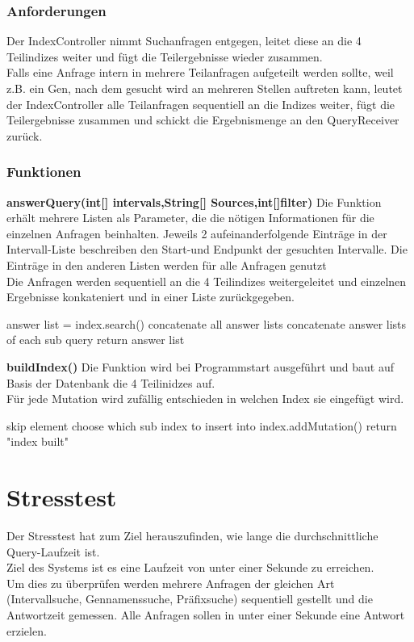 \documentclass[]{article}
\begin{document}
\subsubsection{Anforderungen}
Der IndexController nimmt Suchanfragen entgegen, leitet diese an die 4 Teilindizes weiter und fügt die Teilergebnisse wieder zusammen.\\Falls eine Anfrage intern in mehrere Teilanfragen aufgeteilt werden sollte, weil z.B. ein Gen, nach dem gesucht wird an mehreren Stellen auftreten kann, leutet der IndexController alle Teilanfragen sequentiell an die Indizes weiter, fügt die Teilergebnisse zusammen und schickt die Ergebnismenge an den QueryReceiver zurück.
\subsubsection{Funktionen}
\textbf{answerQuery(int[] intervals,String[] Sources,int[]filter)}
Die Funktion erhält mehrere Listen als Parameter, die die nötigen Informationen für die einzelnen Anfragen beinhalten. Jeweils 2 aufeinanderfolgende Einträge in der Intervall-Liste beschreiben den Start-und Endpunkt der gesuchten Intervalle. Die Einträge in den anderen Listen werden für alle Anfragen genutzt\\
Die Anfragen werden sequentiell an die 4 Teilindizes weitergeleitet und einzelnen Ergebnisse konkateniert und in einer Liste zurückgegeben.
\begin{algorithm}
{
{answer list = index.search()\;}
concatenate all answer lists\;
}
concatenate answer lists of each sub query\;
return answer list\;
\end{algorithm}


\textbf{buildIndex()}
Die Funktion wird bei Programmstart ausgeführt und baut auf Basis der Datenbank die 4 Teilinidzes auf.\\
Für jede Mutation wird zufällig entschieden in welchen Index sie eingefügt wird.\\
\begin{algorithm}
{
{skip element\;}
choose which sub index to insert into\;
index.addMutation()\;
}
return "index built"\;
\end{algorithm}

\newpage
\section{Stresstest}
Der Stresstest hat zum Ziel herauszufinden, wie lange die durchschnittliche Query-Laufzeit ist.\\
Ziel des Systems ist es eine Laufzeit von unter einer Sekunde zu erreichen.\\
Um dies zu überprüfen werden mehrere Anfragen der gleichen Art (Intervallsuche, Gennamenssuche, Präfixsuche) sequentiell gestellt und die Antwortzeit gemessen. Alle Anfragen sollen in unter einer Sekunde eine Antwort erzielen.
\end{document}
